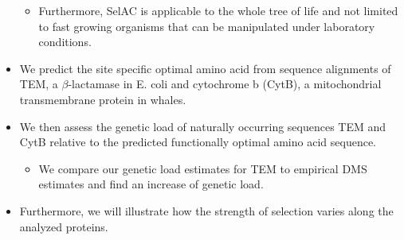 \documentclass[12pt]{article}
\begin{document}
\begin{itemize}
\begin{itemize}
		\item Furthermore, SelAC is applicable to the whole tree of life and not limited to fast growing organisms that can be manipulated under laboratory conditions.
	\end{itemize}
	\item We predict the site specific optimal amino acid from sequence alignments of TEM, a $\beta$-lactamase in E. coli and cytochrome b (CytB), a mitochondrial transmembrane protein in whales.
	\item We then assess the genetic load of naturally occurring sequences TEM and CytB relative to the predicted functionally optimal amino acid sequence.
	\begin{itemize}
		\item We compare our genetic load estimates for TEM to empirical DMS estimates and find an increase of genetic load.
	\end{itemize}
	\item Furthermore, we will illustrate how the strength of selection varies along the analyzed proteins.
\end{itemize}
\end{document}
